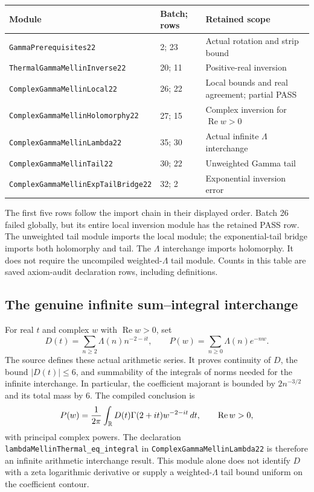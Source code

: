\begin{center}\small
\begin{tabular}{@{}p{}p{}p{}@{}}
\toprule Module & Batch; rows & Retained scope\\\midrule
\nolinkurl{GammaPrerequisites22} & 2; 23 & Actual rotation and strip bound\\
\nolinkurl{ThermalGammaMellinInverse22} & 20; 11 & Positive-real inversion\\
\nolinkurl{ComplexGammaMellinLocal22} & 26; 22 & Local bounds and real agreement; partial PASS\\
\nolinkurl{ComplexGammaMellinHolomorphy22} & 27; 15 & Complex inversion for $\operatorname{Re}w>0$\\
\nolinkurl{ComplexGammaMellinLambda22} & 35; 30 & Actual infinite $\Lambda$ interchange\\
\nolinkurl{ComplexGammaMellinTail22} & 30; 22 & Unweighted Gamma tail\\
\nolinkurl{ComplexGammaMellinExpTailBridge22} & 32; 2 & Exponential inversion error\\
\bottomrule
\end{tabular}
\end{center}

The first five rows follow the import chain in their displayed order.
Batch 26 failed globally, but its entire local inversion module has the
retained PASS row. The unweighted tail module imports the local module;
the exponential-tail bridge imports both holomorphy and tail. The
$\Lambda$ interchange imports holomorphy. It does not require the
uncompiled weighted-$\Lambda$ tail module. Counts in this table are saved
axiom-audit declaration rows, including definitions.

\subsection{The genuine infinite sum--integral interchange}

For real $t$ and complex $w$ with $\operatorname{Re}w>0$, set
\begin{equation}
 D(t)=\sum_{n\geq2}\Lambda(n)n^{-2-it},\qquad
 P(w)=\sum_{n\geq0}\Lambda(n)e^{-nw}.
\end{equation}
The source defines these actual arithmetic series. It proves continuity
of $D$, the bound $|D(t)|\leq6$, and summability of the integrals of norms
needed for the infinite interchange. In particular, the coefficient
majorant is bounded by $2n^{-3/2}$ and its total mass by 6. The compiled
conclusion is
\begin{equation}
 P(w)=\frac1{2\pi}\int_{\mathbb{R}}D(t)\Gamma(2+it)w^{-2-it}\,dt,
 \qquad \operatorname{Re}w>0,
 \label{eq:true-mellin}
\end{equation}
with principal complex powers. The declaration
\nolinkurl{lambdaMellinThermal_eq_integral}
in \nolinkurl{ComplexGammaMellinLambda22}
is therefore an infinite arithmetic interchange result. This module alone
does not identify $D$ with a zeta logarithmic derivative or supply a
weighted-$\Lambda$ tail bound uniform on the coefficient contour.


